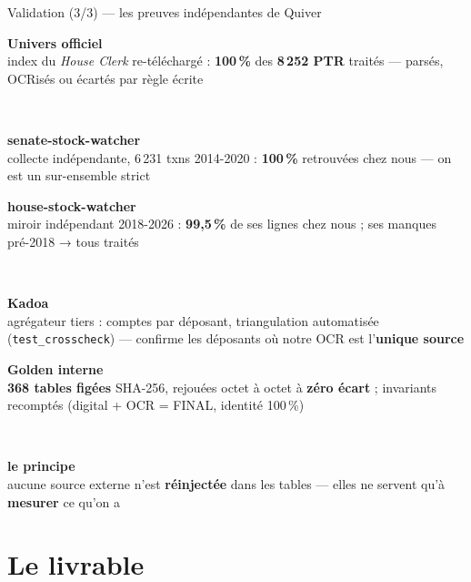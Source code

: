 \documentclass[11pt,aspectratio=169]{beamer}
\newcommand{\co}[1]{\texttt{#1}}
\newcommand{\carte}[3]{%
  \colorbox{#1!10}{\parbox[t][23mm][t]{\dimexpr\linewidth-8pt}{\vspace{1mm}
    {\color{#1}\footnotesize\textbf{#2}}\\[0.8mm]{\scriptsize #3}}}}
\begin{document}
\begin{frame}{Validation (3/3) — les preuves indépendantes de Quiver}
  \centering
  \begin{minipage}[t]{0.32\textwidth}
    \carte{helec}{Univers officiel}{index du \emph{House Clerk} re-téléchargé :
      \textbf{100\,\%} des \textbf{8\,252 PTR} traités — parsés, OCRisés ou écartés
      par règle écrite}\\[2mm]
    \carte{okgreen}{senate-stock-watcher}{collecte indépendante, 6\,231 txns 2014-2020 :
      \textbf{100\,\%} retrouvées chez nous — on est un sur-ensemble strict}
  \end{minipage}\hfill
  \begin{minipage}[t]{0.32\textwidth}
    \carte{selec}{house-stock-watcher}{miroir indépendant 2018-2026 :
      \textbf{99,5\,\%} de ses lignes chez nous ; ses manques pré-2018 → tous traités}\\[2mm]
    \carte{warnorange}{Kadoa}{agrégateur tiers : comptes par déposant, triangulation
      automatisée (\co{test\_crosscheck}) — confirme les déposants où notre OCR
      est l'\textbf{unique source}}
  \end{minipage}\hfill
  \begin{minipage}[t]{0.32\textwidth}
    \carte{alertred}{Golden interne}{\textbf{368 tables figées} SHA-256, rejouées
      octet à octet à \textbf{zéro écart} ; invariants recomptés
      (digital + OCR = FINAL, identité 100\,\%)}\\[2mm]
    \colorbox{black!6}{\parbox[t][23mm][t]{\dimexpr\linewidth-8pt}{\vspace{1mm}
      {\footnotesize\textbf{le principe}}\\[0.8mm]{\scriptsize aucune source externe
      n'est \textbf{réinjectée} dans les tables — elles ne servent qu'à
      \textbf{mesurer} ce qu'on a}}}
  \end{minipage}
\end{frame}

\section{Le livrable}
\end{document}
